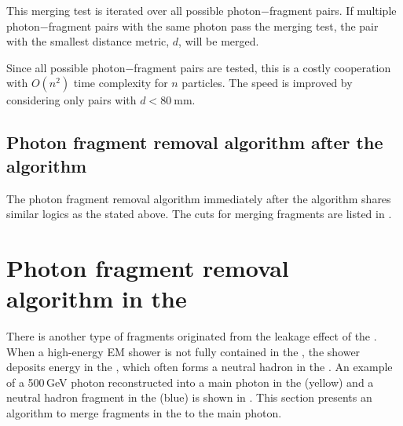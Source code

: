 

This merging test is iterated over all possible  photon$-$fragment pairs. If multiple photon$-$fragment pairs with the same photon pass the merging test, the pair with the smallest distance metric, $d$, will be merged.

Since all possible photon$-$fragment pairs are tested, this is a costly cooperation with $O(n^2)$ time complexity for $n$ particles. The speed is improved by considering only pairs with $d<80\ \text{mm}$.




\subsection{Photon fragment removal algorithm after the \PhotonReconstruction algorithm}

The photon fragment removal algorithm immediately after the \PhotonReconstruction algorithm shares similar logics as the stated above. The cuts for merging fragments are listed in .


\section{Photon fragment removal algorithm in the \HCAL}
\label{sec:photonHighEFragRemoval}


There is another type of fragments originated from the leakage effect of the \ECAL. When a high-energy EM shower is not fully contained in the \ECAL, the shower deposits energy in the \HCAL, which often forms a neutral hadron in the \HCAL. An example of a 500\,GeV photon reconstructed into a main photon in the \ECAL (yellow) and a neutral hadron fragment in the \HCAL (blue) is shown in . This section presents an algorithm to merge fragments in the \HCAL to the main photon.


